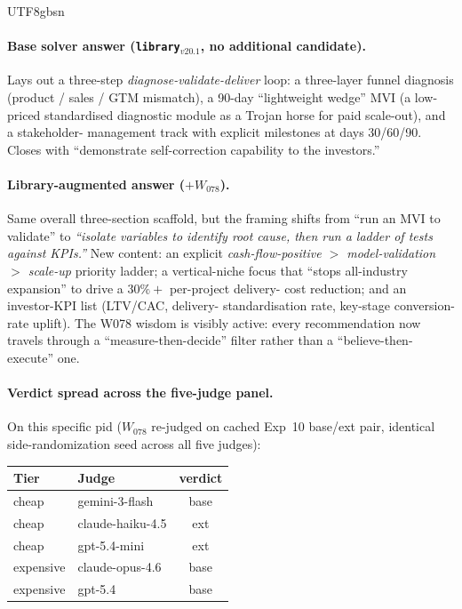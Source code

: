 \documentclass{article}
\begin{document}
\begin{CJK*}{UTF8}{gbsn}
\paragraph{Base solver answer (\texttt{library}\(_{v20.1}\), no
additional candidate).} Lays out a three-step
\emph{diagnose-validate-deliver} loop: a three-layer funnel
diagnosis (product / sales / GTM mismatch), a 90-day
``lightweight wedge'' MVI (a low-priced standardised diagnostic
module as a Trojan horse for paid scale-out), and a stakeholder-
management track with explicit milestones at days 30/60/90. Closes
with ``demonstrate self-correction capability to the investors.''

\paragraph{Library-augmented answer (\(+ W_{078}\)).} Same overall
three-section scaffold, but the framing shifts from ``run an MVI
to validate'' to \emph{``isolate variables to identify root cause,
then run a ladder of tests against KPIs.''} New content: an
explicit \emph{cash-flow-positive \(>\) model-validation \(>\)
scale-up} priority ladder; a vertical-niche focus that ``stops
all-industry expansion'' to drive a \(30\%+\) per-project delivery-
cost reduction; and an investor-KPI list (LTV/CAC, delivery-
standardisation rate, key-stage conversion-rate uplift). The
W078 wisdom is visibly active: every recommendation now travels
through a ``measure-then-decide'' filter rather than a
``believe-then-execute'' one.

\paragraph{Verdict spread across the five-judge panel.} On this
specific pid (\(W_{078}\) re-judged on cached Exp~10 base/ext
pair, identical side-randomization seed across all five judges):

\begin{center}\small
\begin{tabular}{l l c}
  \toprule
  Tier & Judge & verdict \\
  \midrule
  cheap     & gemini-3-flash    & base \\
  cheap     & claude-haiku-4.5  & ext  \\
  cheap     & gpt-5.4-mini      & ext  \\
  \midrule
  expensive & claude-opus-4.6   & base \\
  expensive & gpt-5.4           & base \\
  \bottomrule
\end{tabular}
\end{center}


\end{CJK*}
\end{document}
